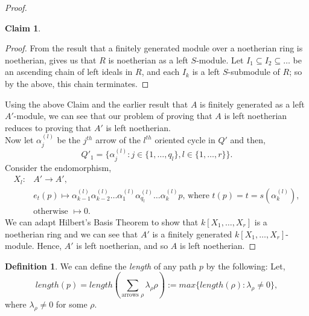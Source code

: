 \documentclass[11.5pt, twoside, a4paper, titlepage]{report}
\providecommand{\equ}[0]{\begin{equation*}}
\providecommand{\eequ}[0] {\end{equation*}}
\theoremstyle{definition}
\newtheorem{mydef}{Definition}[section]
\theoremstyle{plain}
\newtheorem*{claim}{Claim}
\begin{document}
\begin{proof}
\begin{claim}
\end{claim}
\begin{proof}
From the result that a finitely generated module over a noetherian ring is noetherian, gives us that $R$ is noetherian as a left $S$-module. Let $I_1 \subseteq I_2 \subseteq \dots$ be an ascending chain of left ideals in $R$, and each $I_k$ is a left $S$-submodule of $R$; so by the above, this chain terminates.
\end{proof}
Using the above Claim and the earlier result that $A$ is finitely generated as a left $A'$-module, we can see that our problem of proving that $A$ is left noetherian reduces to proving that $A'$ is left noetherian.\\
Now let $\alpha^{(l)}_j$ be the $j^{th}$ arrow of the $l^{th}$ oriented cycle in $Q'$ and then, 
\equ
Q'_1=\{\alpha^{(l)}_j : j \in \{1, \dots, q_l\}, l \in \{1, \dots, r\}\}.
\eequ
Consider the endomorphism, 
\begin{align*}
X_l: &A' \to A', \\
&e_t(p) \mapsto \alpha^{(l)}_{k-1}\alpha^{(l)}_{k-2}\dots \alpha^{(l)}_{1}\alpha^{(l)}_{q_l}\dots \alpha^{(l)}_{k}p\text{, where } t(p)=t=s(\alpha^{(l)}_{k}), \\
&\text{otherwise }\mapsto 0.
\end{align*}
We can adapt Hilbert's Basis Theorem to show that $k[X_1, \dots, X_r]$ is a noetherian ring and we can see that $A'$ is a finitely generated $k[X_1, \dots, X_r]$-module. Hence, $A'$ is left noetherian, and so $A$ is left noetherian.
\end{proof}

\begin{mydef}
We can define the \emph{length} of any path $p$ by the following: Let, 
\equ 
length(p)=length(\sum_{\text{arrows }\rho}\lambda_{\rho}\rho):=max\{length(\rho):\lambda_\rho\neq0\},
\eequ
where $\lambda_\rho\neq 0$ for some $\rho$. 
\end{mydef}
\end{document}
